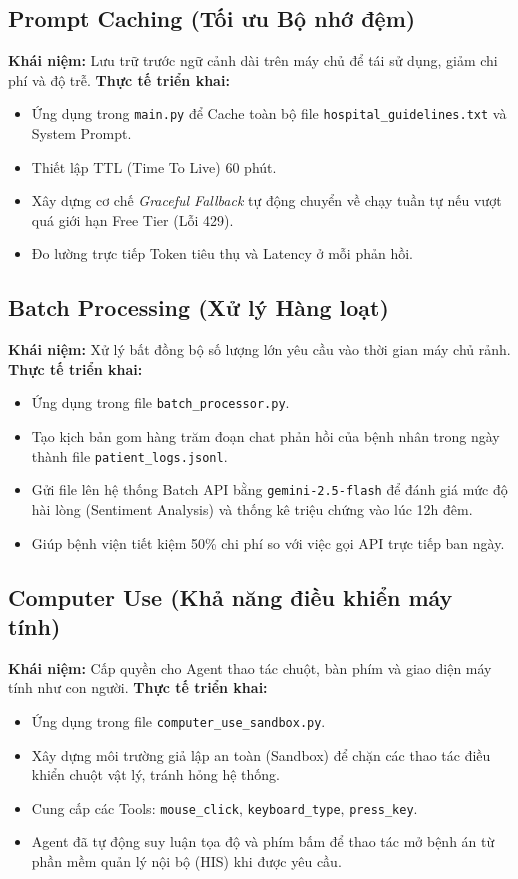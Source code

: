 \documentclass[12pt]{article}
\begin{document}
\subsection{Prompt Caching (Tối ưu Bộ nhớ đệm)}
\textbf{Khái niệm:} Lưu trữ trước ngữ cảnh dài trên máy chủ để tái sử dụng, giảm chi phí và độ trễ.
\textbf{Thực tế triển khai:}
\begin{itemize}
    \item Ứng dụng trong \texttt{main.py} để Cache toàn bộ file \texttt{hospital\_guidelines.txt} và System Prompt.
    \item Thiết lập TTL (Time To Live) 60 phút.
    \item Xây dựng cơ chế \textit{Graceful Fallback} tự động chuyển về chạy tuần tự nếu vượt quá giới hạn Free Tier (Lỗi 429).
    \item Đo lường trực tiếp Token tiêu thụ và Latency ở mỗi phản hồi.
\end{itemize}

\subsection{Batch Processing (Xử lý Hàng loạt)}
\textbf{Khái niệm:} Xử lý bất đồng bộ số lượng lớn yêu cầu vào thời gian máy chủ rảnh.
\textbf{Thực tế triển khai:}
\begin{itemize}
    \item Ứng dụng trong file \texttt{batch\_processor.py}.
    \item Tạo kịch bản gom hàng trăm đoạn chat phản hồi của bệnh nhân trong ngày thành file \texttt{patient\_logs.jsonl}.
    \item Gửi file lên hệ thống Batch API bằng \texttt{gemini-2.5-flash} để đánh giá mức độ hài lòng (Sentiment Analysis) và thống kê triệu chứng vào lúc 12h đêm.
    \item Giúp bệnh viện tiết kiệm 50\% chi phí so với việc gọi API trực tiếp ban ngày.
\end{itemize}

\subsection{Computer Use (Khả năng điều khiển máy tính)}
\textbf{Khái niệm:} Cấp quyền cho Agent thao tác chuột, bàn phím và giao diện máy tính như con người.
\textbf{Thực tế triển khai:}
\begin{itemize}
    \item Ứng dụng trong file \texttt{computer\_use\_sandbox.py}.
    \item Xây dựng môi trường giả lập an toàn (Sandbox) để chặn các thao tác điều khiển chuột vật lý, tránh hỏng hệ thống.
    \item Cung cấp các Tools: \texttt{mouse\_click}, \texttt{keyboard\_type}, \texttt{press\_key}.
    \item Agent đã tự động suy luận tọa độ và phím bấm để thao tác mở bệnh án từ phần mềm quản lý nội bộ (HIS) khi được yêu cầu.
\end{itemize}
\end{document}
